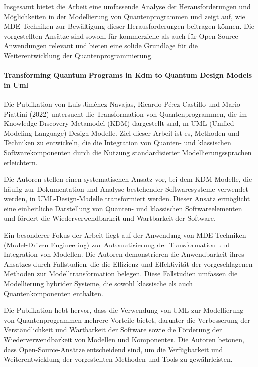 Insgesamt bietet die Arbeit eine umfassende Analyse der Herausforderungen und Möglichkeiten in der Modellierung 
von Quantenprogrammen und zeigt auf, wie MDE-Techniken zur Bewältigung dieser Herausforderungen beitragen können. 
Die vorgestellten Ansätze sind sowohl für kommerzielle als auch für Open-Source-Anwendungen relevant und bieten 
eine solide Grundlage für die Weiterentwicklung der Quantenprogrammierung.

\paragraph{Transforming Quantum Programs in Kdm to Quantum Design Models in Uml}

Die Publikation von Luis Jiménez-Navajas, Ricardo Pérez-Castillo und Mario Piattini (2022) \cite{Jimenez-Navajas_2022} untersucht die 
Transformation von Quantenprogrammen, die im Knowledge Discovery Metamodel (KDM) dargestellt sind, in 
UML (Unified Modeling Language) Design-Modelle. Ziel dieser Arbeit ist es, Methoden und Techniken zu 
entwickeln, die die Integration von Quanten- und klassischen Softwarekomponenten durch die Nutzung 
standardisierter Modellierungssprachen erleichtern.

Die Autoren stellen einen systematischen Ansatz vor, bei dem KDM-Modelle, die häufig zur Dokumentation und 
Analyse bestehender Softwaresysteme verwendet werden, in UML-Design-Modelle transformiert werden. Dieser Ansatz 
ermöglicht eine einheitliche Darstellung von Quanten- und klassischen Softwareelementen und fördert die 
Wiederverwendbarkeit und Wartbarkeit der Software.

Ein besonderer Fokus der Arbeit liegt auf der Anwendung von MDE-Techniken (Model-Driven Engineering) zur Automatisierung 
der Transformation und Integration von Modellen. Die Autoren demonstrieren die Anwendbarkeit ihres Ansatzes durch 
Fallstudien, die die Effizienz und Effektivität der vorgeschlagenen Methoden zur Modelltransformation belegen. 
Diese Fallstudien umfassen die Modellierung hybrider Systeme, die sowohl klassische als auch Quantenkomponenten enthalten.

Die Publikation hebt hervor, dass die Verwendung von UML zur Modellierung von Quantenprogrammen mehrere Vorteile 
bietet, darunter die Verbesserung der Verständlichkeit und Wartbarkeit der Software sowie die Förderung der 
Wiederverwendbarkeit von Modellen und Komponenten. Die Autoren betonen, dass Open-Source-Ansätze entscheidend sind, um 
die Verfügbarkeit und Weiterentwicklung der vorgestellten Methoden und Tools zu gewährleisten.

